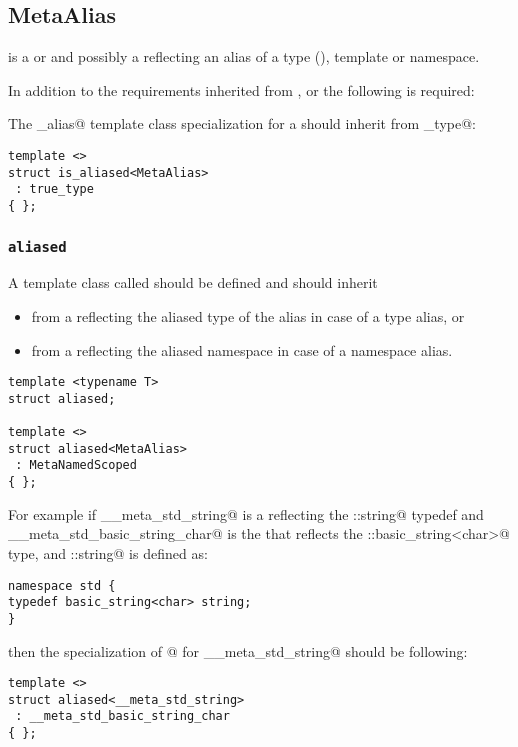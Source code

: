 \subsection{MetaAlias}
\label{concept-MetaAlias}

 is a  or  and possibly a 
reflecting an alias of a type (\verb@typedef@), template or namespace.

In addition to the requirements inherited from , 
or  the following is required:

The \verb@is_alias@ template class specialization for a  should
inherit from \verb@true_type@:

\begin{verbatim}
template <>
struct is_aliased<MetaAlias>
 : true_type
{ };
\end{verbatim}

\subsubsection{\texttt{aliased}}

A template class called \verb@aliased@ should be defined and should inherit
\begin{itemize}
\item from a 
reflecting the aliased type of the alias in case of a type alias, or
\item from a 
reflecting the aliased namespace in case of a namespace alias.
\end{itemize}

\begin{verbatim}
template <typename T>
struct aliased;

template <>
struct aliased<MetaAlias>
 : MetaNamedScoped
{ };
\end{verbatim}

For example if \verb@__meta_std_string@ is a  reflecting the \verb@std::string@
typedef and \verb@__meta_std_basic_string_char@ is the  that reflects
the \verb@std::basic_string<char>@ type, and \verb@std::string@ is defined as:

\begin{verbatim}
namespace std {
typedef basic_string<char> string;
}
\end{verbatim}

then the specialization of \verb@aliased @ for \verb@__meta_std_string@ should be following:

\begin{verbatim}
template <>
struct aliased<__meta_std_string>
 : __meta_std_basic_string_char
{ };
\end{verbatim}

